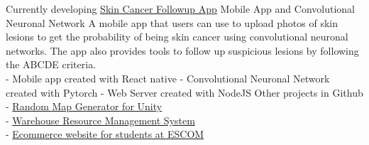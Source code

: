 \documentclass[9pt]{developercv} %
\begin{document}


\begin{entrylist}
	\entry
		{Currently developing}
		{\href{https://github.com/EstebanOlmedo/melanoma-tt}{Skin Cancer Followup App}}
		{Mobile App and Convolutional Neuronal Network}
		{A mobile app that users can use to upload photos of skin lesions to get the probability of being skin cancer using convolutional neuronal networks. The app also provides tools to follow up suspicious lesions by following the ABCDE criteria.\\
		- Mobile app created with React native
		- Convolutional Neuronal Network created with Pytorch
		- Web Server created with NodeJS}
	\entry
		{}
		{Other projects in Github}
		{}
		{
			- \href{https://github.com/DanielMontesGuerrero/random-map-generator}{Random Map Generator for Unity}\\
			- \href{https://github.com/DanielMontesGuerrero/sistema-picking-app}{Warehouse Resource Management System}\\
			- \href{https://github.com/DanielMontesGuerrero/la-tiendita}{Ecommerce website for students at ESCOM}\\
		}
\end{entrylist}

\end{document}
